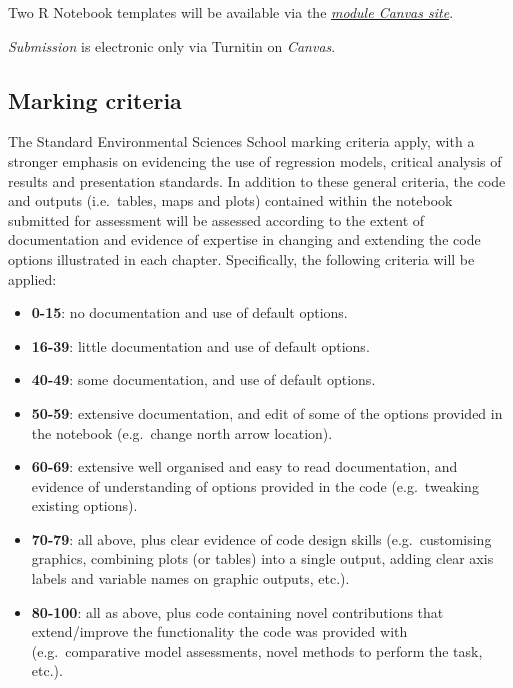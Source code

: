 \documentclass[
  letterpaper,
  DIV=11,
  numbers=noendperiod]{scrreprt}
\providecommand{\tightlist}{%
  \setlength{\itemsep}{0pt}\setlength{\parskip}{0pt}}\usepackage{longtable,booktabs,array}
\begin{document}
Two R Notebook templates will be available via the
\href{https://liverpool.instructure.com}{\emph{module Canvas site}}.

\emph{Submission} is electronic only via Turnitin on \emph{Canvas}.

\hypertarget{marking-criteria}{%
\subsection{Marking criteria}\label{marking-criteria}}

The Standard Environmental Sciences School marking criteria apply, with
a stronger emphasis on evidencing the use of regression models, critical
analysis of results and presentation standards. In addition to these
general criteria, the code and outputs (i.e.~tables, maps and plots)
contained within the notebook submitted for assessment will be assessed
according to the extent of documentation and evidence of expertise in
changing and extending the code options illustrated in each chapter.
Specifically, the following criteria will be applied:

\begin{itemize}
\tightlist
\item
  \textbf{0-15}: no documentation and use of default options.
\item
  \textbf{16-39}: little documentation and use of default options.
\item
  \textbf{40-49}: some documentation, and use of default options.
\item
  \textbf{50-59}: extensive documentation, and edit of some of the
  options provided in the notebook (e.g.~change north arrow location).
\item
  \textbf{60-69}: extensive well organised and easy to read
  documentation, and evidence of understanding of options provided in
  the code (e.g.~tweaking existing options).
\item
  \textbf{70-79}: all above, plus clear evidence of code design skills
  (e.g.~customising graphics, combining plots (or tables) into a single
  output, adding clear axis labels and variable names on graphic
  outputs, etc.).
\item
  \textbf{80-100}: all as above, plus code containing novel
  contributions that extend/improve the functionality the code was
  provided with (e.g.~comparative model assessments, novel methods to
  perform the task, etc.).
\end{itemize}

\end{document}
